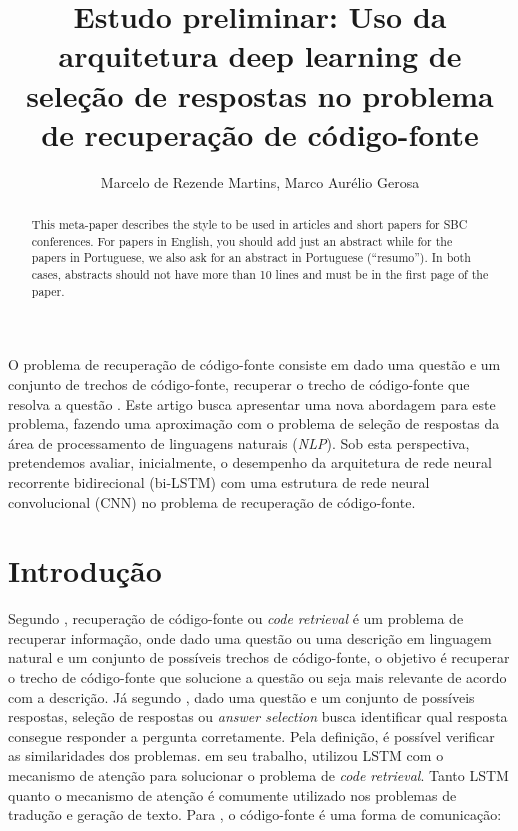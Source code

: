 \documentclass[12pt]{article}
\title{Estudo preliminar: Uso da arquitetura deep learning de seleção de respostas no problema de recuperação de código-fonte}
\author{Marcelo de Rezende Martins\inst{1}, Marco Aurélio Gerosa\inst{2}}
\begin{document}
 

\maketitle

\begin{abstract}
  This meta-paper describes the style to be used in articles and short papers
  for SBC conferences. For papers in English, you should add just an abstract
  while for the papers in Portuguese, we also ask for an abstract in
  Portuguese (``resumo''). In both cases, abstracts should not have more than
  10 lines and must be in the first page of the paper.
\end{abstract}
     
\begin{resumo} 
  O problema de recuperação de código-fonte consiste em dado uma questão e um conjunto de trechos de código-fonte, recuperar o trecho de código-fonte que resolva a questão . Este artigo busca apresentar uma nova abordagem para este problema, fazendo uma aproximação com o problema de seleção de respostas da área de processamento de linguagens naturais (\emph{NLP}). Sob esta perspectiva, pretendemos avaliar, inicialmente, o desempenho da arquitetura de rede neural recorrente bidirecional (bi-LSTM) com uma estrutura de rede neural convolucional (CNN) no problema de recuperação de código-fonte. 
\end{resumo}


\section{Introdução}

Segundo \cite{Allamanis-bimodal-source-code-natural-language:2015}, recuperação de código-fonte ou \textit{code retrieval} é um problema de recuperar informação, onde dado uma questão ou uma descrição em linguagem natural e um conjunto de possíveis trechos de código-fonte, o objetivo é recuperar o trecho de código-fonte que solucione a questão ou seja mais relevante de acordo com a descrição. Já segundo \cite{lai-etal-2018-review},
dado uma questão e um conjunto de possíveis respostas, seleção de respostas ou \textit{answer selection} busca identificar qual resposta consegue responder a 
pergunta corretamente. Pela definição, é possível verificar as similaridades dos problemas. \cite{iyer-etal-2016-summarizing} em seu trabalho, utilizou LSTM com o mecanismo de atenção para solucionar
o problema de \textit{code retrieval}. Tanto LSTM quanto o mecanismo de atenção é comumente utilizado nos problemas de tradução e geração de texto. Para \cite{Knuth:1984:LP}, 
o código-fonte é uma forma de comunicação:
\end{document}

